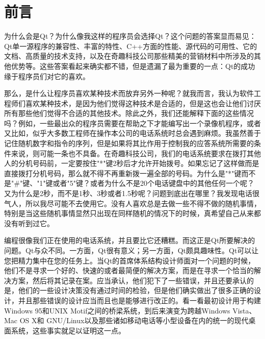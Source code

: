 \documentclass[11pt,oneside]{book}
\begin{document}
\frontmatter

\author{Jasmin B., Mark S.}
\titleLA

\chapter*{前言}
\begin{common-format}
为什么会是Qt？为什么像我这样的程序员会选择Qt？这个问题的答案显而易见：Qt单一源程序的兼容性、丰富的特性、C++方面的性能、源代码的可用性、它的文档、高质量的技术支持，以及在奇趣科技公司那些精美的营销材料中所涉及的其他优势等。这些答案看起来确实都不错，但是遗漏了最为重要的一点：Qt的成功缘于程序员们对它的喜欢。

那么，是什么让程序员喜欢某种技术而放弃另外一种呢？就我而言，我认为软件工程师们喜欢某种技术，是因为他们觉得这种技术是合适的，但是这也会让他们讨厌所有那些他们觉得不合适的其他技术。除此之外，我们还能解释下面的这些情况吗？例如，一些最出众的程序员需要在帮助之下才能编写出一个录像机程序，或者又比如，似乎大多数工程师在操作本公司的电话系统时总会遇到麻烦。我虽然善于记住随机数字和指令的序列，但是如果将其比作用于控制我的应答系统所需要的条件来说，则可能一条也不具备。在奇趣科技公司，我们的电话系统要求在拨打其他人的分机号码前，一定要按住"*"键2秒后才允许开始拨号。如果忘记了这样做而是直接拨打分机号码，那么就不得不再重新拨一遍全部的号码。为什么是"*"键而不是"\#{}"键、"1"键或者"5"键？或者为什么不是20个电话键盘中的其他任何一个呢？又为什么是2秒，而不是1秒、3秒或者1.5秒呢？问题到底出在哪里？我发现电话很气人，所以我尽可能不去使用它。没有人喜欢总是去做一些不得不做的随机事情，特别是当这些随机事情显然只出现在同样随机的情况下的时候，真希望自己从来都没有听到过它。

编程很像我们正在使用的电话系统，并且要比它还糟糕。而这正是Qt所要解决的问题。Qt与众不同。一方面，Qt很有意义；另一方面，Qt颇具趣味性。Qt可以让您把精力集中在您的任务上。当Qt的首席体系结构设计师面对一个问题的时候，他们不是寻求一个好的、快速的或者最简便的解决方案，而是在寻求一个恰当的解决方案，然后将其记录在案。应当承认，他们犯下了一些错误，并且还要承认的是，他们的一些设计决策没有通过时间的检验，但是他们确实做出了很多正确的设计，并且那些错误的设计应当而且也是能够进行改正的。看一看最初设计用于构建Windows 95和UNIX Motif之间的桥梁系统，到后来演变为跨越Windows Vista、Mac OS X和
GNU/Linux以及那些诸如移动电话等小型设备在内的统一的现代桌面系统，这些事实就足以证明这一点。


\end{common-format}
\end{document}
